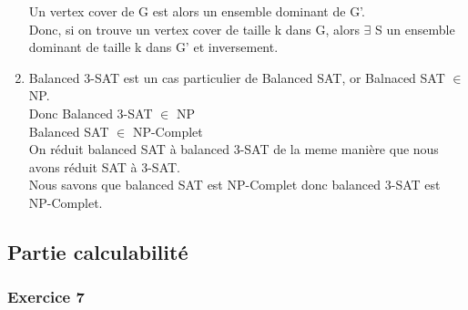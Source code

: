 \documentclass[]{article}
\begin{document}
\begin{enumerate}
      Un vertex cover de G est alors un ensemble dominant de G'.\\
      Donc, si on trouve un vertex cover de taille k dans G, alors $\exists$ S un ensemble dominant de taille k dans G' et inversement.\\
      \smallbreak

    \item
      Balanced 3-SAT est un cas particulier de Balanced SAT, or Balnaced SAT $\in$ NP.\\
      Donc Balanced 3-SAT $\in$ NP\\

      Balanced SAT $\in$ NP-Complet\\

      On réduit balanced SAT à balanced 3-SAT de la meme manière que nous avons réduit SAT à 3-SAT.\\
      Nous savons que balanced SAT est NP-Complet donc balanced 3-SAT est NP-Complet.\\

\end{enumerate}



\subsection{Partie calculabilité}



\subsubsection{Exercice 7}

\noindent{}\\\\
\end{document}
